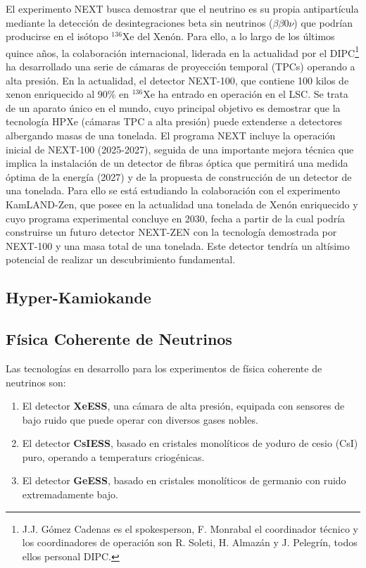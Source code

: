 \documentclass[12pt,a4paper,article]{report} %
\def\xess{{\bf XeESS}}
\def\gess{{\bf GeESS}}
\def\cess{{\bf CsIESS}}
\begin{document}
El experimento NEXT busca demostrar que el neutrino es su propia antipartícula mediante la detección de desintegraciones beta sin neutrinos ($\beta\beta0\nu$) que podrían producirse en el isótopo ${}^{136}$Xe del Xenón. Para ello, a lo largo de los últimos quince años, la colaboración internacional, liderada en la actualidad por el DIPC\footnote{J.J. Gómez Cadenas es el spokesperson, F. Monrabal el coordinador técnico y los coordinadores de operación son R. Soleti, H. Almazán y J. Pelegrín, todos ellos personal DIPC.} ha desarrollado una serie de cámaras de proyección temporal (TPCs) operando a alta presión. En la actualidad, el detector NEXT-100, que contiene 100 kilos de xenon enriquecido al 90\% en ${}^{136}$Xe ha entrado en operación en el LSC. Se trata de un aparato único en el mundo, cuyo principal objetivo es demostrar que la tecnología HPXe (cámaras TPC a alta presión) puede extenderse a detectores albergando masas de una tonelada. El programa NEXT incluye la operación inicial de NEXT-100 (2025-2027), seguida de una importante mejora técnica que implica la instalación de un detector de fibras óptica que permitirá una medida óptima de la energía (2027) y de la propuesta de construcción de un detector de una tonelada. Para ello se está estudiando la colaboración con el experimento KamLAND-Zen, que posee en la actualidad una tonelada de Xenón enriquecido y cuyo programa experimental concluye en 2030, fecha a partir de la cual podría construirse un futuro detector NEXT-ZEN con la tecnología demostrada por NEXT-100 y una masa total de una tonelada.  Este detector tendría un altísimo potencial de realizar un descubrimiento fundamental.

\subsection*{Hyper-Kamiokande}

\subsection*{Física Coherente de Neutrinos}

Las tecnologías en desarrollo para los experimentos de física coherente de neutrinos son: 

\begin{enumerate}
\item El detector \xess,  una cámara de alta presión, equipada con sensores de bajo ruido que puede operar con diversos gases nobles.  
\item El detector \cess, basado en cristales monolíticos de yoduro de cesio (CsI) puro, operando a temperaturs criogénicas.
\item El detector  \gess, basado en cristales monolíticos de germanio con ruido extremadamente bajo.
\end{enumerate}
\end{document}
